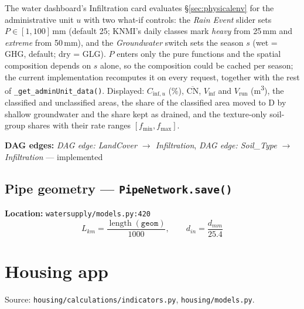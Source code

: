 \documentclass[11pt]{article}
\newcommand{\code}[1]{\texttt{#1}}
\newcommand{\dagedge}[1]{\textit{DAG edge: #1}}
\newcommand{\statusdone}{\textcolor{green!50!black}{implemented}}
\begin{document}
The water dashboard's Infiltration card evaluates \S\ref{sec:physicalenv} for the administrative unit $u$ with two what-if controls: the \textit{Rain Event} slider sets $P \in [1, 100]$\,\si{mm} (default 25; KNMI's daily classes mark \emph{heavy} from 25\,mm and \emph{extreme} from 50\,mm), and the \textit{Groundwater} switch sets the season $s$ (wet = GHG, default; dry = GLG). $P$ enters only the pure functions and the spatial composition depends on $s$ alone, so the composition could be cached per season; the current implementation recomputes it on every request, together with the rest of \code{\_get\_adminUnit\_data()}. Displayed: $C_{\text{inf},u}$ (\%), $\overline{\mathrm{CN}}$, $V_{\text{inf}}$ and $V_{\text{run}}$ (\si{m^3}), the classified and unclassified areas, the share of the classified area moved to D by shallow groundwater and the share kept as drained, and the texture-only soil-group shares with their rate ranges $[f_{\min}, f_{\max}]$.

\textbf{DAG edges:} \dagedge{LandCover $\rightarrow$ Infiltration}, \dagedge{Soil\_Type $\rightarrow$ Infiltration} --- \statusdone{}

\subsection{Pipe geometry --- \code{PipeNetwork.save()}}
\textbf{Location:} \code{watersupply/models.py:420}
\begin{equation}
  L_{\si{km}} = \frac{\operatorname{length}(\texttt{geom})}{1000}, \qquad d_{\si{in}} = \frac{d_{\si{mm}}}{25.4}
\end{equation}

\section{Housing app}
\label{sec:housing}

Source: \code{housing/calculations/indicators.py}, \code{housing/models.py}.
\end{document}

